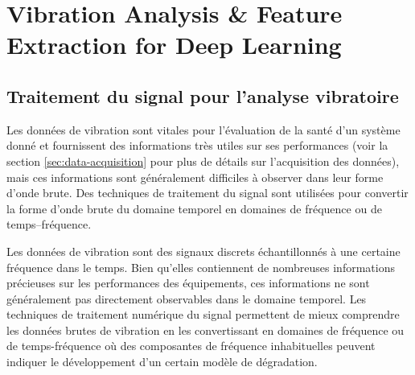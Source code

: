 \chapter{Vibration Analysis \& Feature Extraction for Deep Learning}

\section{Traitement du signal pour l'analyse vibratoire}
Les données de vibration sont vitales pour l'évaluation de la santé d'un système donné et fournissent des informations très utiles sur ses performances (voir la section \ref{sec:data-acquisition} pour plus de détails sur l'acquisition des données), mais ces informations sont généralement difficiles à observer dans leur forme d'onde brute. Des techniques de traitement du signal sont utilisées pour convertir la forme d'onde brute du domaine temporel en domaines de fréquence ou de temps–fréquence.

Les données de vibration sont des signaux discrets échantillonnés à une certaine fréquence dans le temps. Bien qu'elles contiennent de nombreuses informations précieuses sur les performances des équipements, ces informations ne sont généralement pas directement observables dans le domaine temporel. Les techniques de traitement numérique du signal permettent de mieux comprendre les données brutes de vibration en les convertissant en domaines de fréquence ou de temps-fréquence où des composantes de fréquence inhabituelles peuvent indiquer le développement d'un certain modèle de dégradation.



